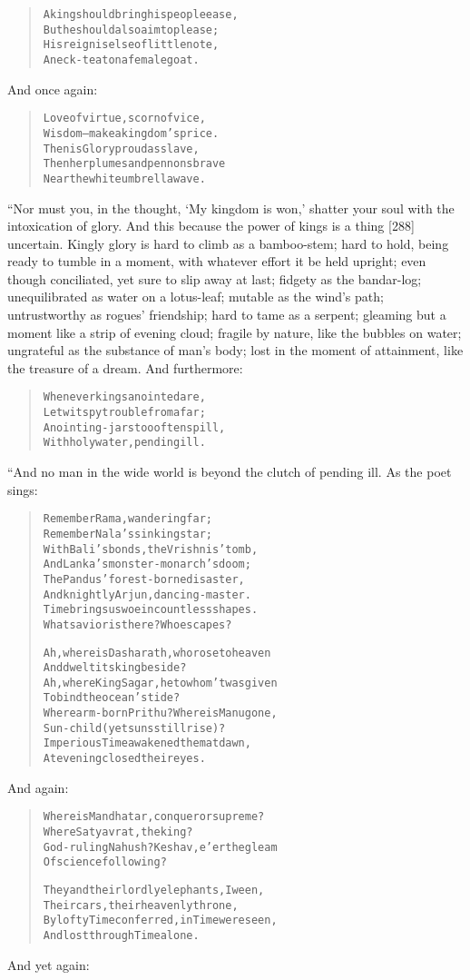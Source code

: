 \documentclass[article, twoside, 14pt]{memoir}
\renewenvironment{verbatim}{%
\begin{quote}%
\vskip -10pt%
\begin{alltt}\normalfont\large}{\end{alltt}%
\end{quote}%
\vskip -10pt
} %
\begin{document}
\begin{verbatim}
A king should bring his people ease,
But he should also aim to please;
His reign is else of little note,
A neck-teat on a female goat.
\end{verbatim}
And once again:

\begin{verbatim}
Love of virtue, scorn of vice,
Wisdom--make a kingdom's price.
Then is Glory proud as slave,
Then her plumes and pennons brave
Near the white umbrella wave.
\end{verbatim}
“Nor must you, in the thought, `My kingdom is won,' shatter your
soul with the intoxication of glory. And this because the power of
kings is a thing [288] uncertain. Kingly glory is hard to climb as
a bamboo-stem; hard to hold, being ready to tumble in a moment,
with whatever effort it be held upright; even though conciliated,
yet sure to slip away at last; fidgety as the bandar-log;
unequilibrated as water on a lotus-leaf; mutable as the wind's
path; untrustworthy as rogues' friendship; hard to tame as a
serpent; gleaming but a moment like a strip of evening cloud;
fragile by nature, like the bubbles on water; ungrateful as the
substance of man's body; lost in the moment of attainment, like the
treasure of a dream. And furthermore:

\begin{verbatim}
Whenever kings anointed are,
Let wit spy trouble from afar;
Anointing-jars too often spill,
With holy water, pending ill.
\end{verbatim}
“And no man in the wide world is beyond the clutch of pending ill.
As the poet sings:

\begin{verbatim}
Remember Rama, wandering far;
Remember Nala's sinking star;
With Bali's bonds, the Vrishnis' tomb,
And Lanka's monster-monarch's doom;
The Pandus' forest-borne disaster,
And knightly Arjun, dancing-master.
Time brings us woe in countless shapes.
What savior is there? Who escapes?

Ah, where is Dasharath, who rose to heaven
    And dwelt its king beside?
Ah, where King Sagar, he to whom 'twas given
    To bind the ocean's tide?
Where arm-born Prithu? Where is Manu gone,
    Sun-child (yet suns still rise)?
Imperious Time awakened them at dawn,
At evening closed their eyes.
\end{verbatim}
And again:

\begin{verbatim}
Where is Mandhatar, conqueror supreme?
    Where Satyavrat, the king?
God-ruling Nahush? Keshav, e'er the gleam
    Of science following?

They and their lordly elephants, I ween,
    Their cars, their heavenly throne,
By lofty Time conferred, in Time were seen,
    And lost through Time alone.
\end{verbatim}
And yet again:
\end{document}
